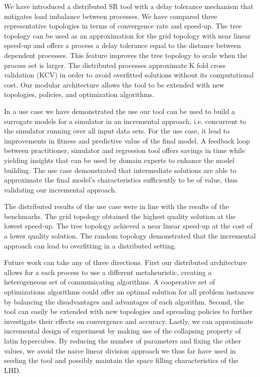 We have introduced a distributed SR tool with a delay tolerance mechanism that mitigates load imbalance between processes. We have compared three representative topologies in terms of convergence rate and speed-up. The tree topology can be used as an approximation for the grid topology with near linear speed-up and offers a process a delay tolerance equal to the distance between dependent processes. This feature improves the tree topology to scale when the process set is larger. The distributed processes approximate K fold cross validation (KCV) in order to avoid overfitted solutions without its computational cost. Our modular architecture allows the tool to be extended with new topologies, policies, and optimization algorithms. 

In a use case we have demonstrated the use our tool can be used to build a surrogate models for a simulator in an incremental approach, i.e. concurrent to the simulator running over all input data sets. For the use case, it lead to improvements in fitness and predictive value of the final model. A feedback loop between practitioner, simulator and regression tool offers savings in time while yielding insights that can be used by domain experts to enhance the model building. The use case demonstrated that intermediate solutions are able to approximate the final model's characteristics sufficiently to be of value, thus validating our incremental approach. 

The distributed results of the use case were in line with the results of the benchmarks. The grid topology obtained the highest quality solution at the lowest speed-up. The tree topology achieved a near linear speed-up at the cost of a lower quality solution. The random topology demonstrated that the incremental approach can lead to overfitting in a distributed setting. 

Future work can take any of three directions. First our distributed architecture allows for a each process to use a different metaheuristic, creating a heterogeneous set of communicating algorithms. A cooperative set of optimizations algorithms could offer an optimal solution for all problem instances by balancing the disadvantages and advantages of each algorithm. 
Second, the tool can easily be extended with new topologies and spreading policies to further investigate their effects on convergence and accuracy. Lastly, we can approximate incremental design of experiment by making use of the collapsing property of latin hypercubes. By reducing the number of parameters and fixing the other values, we avoid the naive linear division approach we thus far have used in seeding the tool and possibly maintain the space filling characteristics of the LHD.

